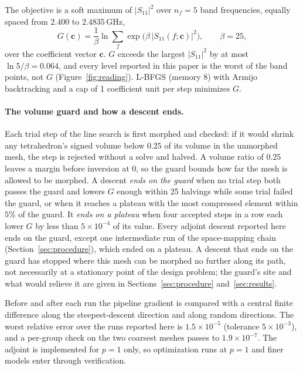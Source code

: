 \documentclass{anvil-paper}
\begin{document}
The objective is a soft maximum of $|S_{11}|^2$ over $n_f = 5$ band
frequencies, equally spaced from $2.400$ to $2.4835$\,GHz,
\begin{equation}
  G(\mathbf{c}) = \frac{1}{\beta}\ln \sum_{f} \exp\!\big(\beta\,|S_{11}(f;\mathbf{c})|^2\big),
  \qquad \beta = 25,
  \label{eq:objective}
\end{equation}
over the coefficient vector $\mathbf{c}$. $G$ exceeds the largest
$|S_{11}|^2$ by at most $\ln 5/\beta = 0.064$, and every level reported in
this paper is the worst of the band points, not $G$
(Figure~\ref{fig:reading}). L-BFGS (memory 8) with
Armijo backtracking and a cap of 1 coefficient unit per step minimizes $G$.

\paragraph{The volume guard and how a descent ends.}
Each trial step of the line search is first morphed and checked: if it would
shrink any tetrahedron's signed volume below $0.25$ of its volume in the
unmorphed mesh, the step is rejected without a solve and halved. A volume
ratio of $0.25$ leaves a margin before inversion at $0$, so the guard bounds
how far the mesh is allowed to be morphed. A descent \emph{ends on the guard}
when no trial step both passes the guard and lowers $G$ enough within 25
halvings while some trial failed the guard, or when it reaches a plateau with
the most compressed element within $5\%$ of the guard. It \emph{ends on a
plateau} when four accepted steps in a row each lower $G$ by less than
$5\times10^{-4}$ of its value. Every adjoint descent reported here ends on the
guard, except one intermediate run of the space-mapping chain
(Section~\ref{sec:procedure}), which ended on a plateau. A descent that ends
on the guard has stopped where this mesh can be morphed no further along its
path, not necessarily at a stationary point of the design problem; the guard's
site and what would relieve it are given in Sections~\ref{sec:procedure}
and~\ref{sec:results}.

Before and after each run the pipeline gradient is compared with a central
finite difference along the steepest-descent direction and along random
directions. The worst relative error over the runs reported here is
$1.5\times10^{-5}$ (tolerance $5\times10^{-3}$), and a per-group check on the
two coarsest meshes passes to $1.9\times10^{-7}$. The adjoint is implemented
for $p = 1$ only, so optimization runs at $p = 1$ and finer models enter
through verification.
\end{document}
